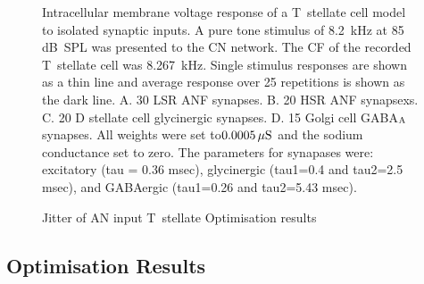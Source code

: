 \begin{figure}[htb]
  \centering
  \caption[Response of T~stellate cells to isolated synaptic
  inputs]{Intracellular membrane voltage response of a T~stellate cell model to isolated synaptic inputs.
A pure tone stimulus of 8.2~kHz at 85 dB~SPL was presented to the CN network. The CF of the recorded T~stellate cell was 8.267~kHz.
Single stimulus responses are shown as a thin line and average response over 25 repetitions is shown as the dark line.
A. 30 LSR ANF synapses.
B. 20 HSR ANF synapsexs.
C. 20 D stellate cell glycinergic synapses.
D. 15 Golgi cell GABA$_{\rm A}$ synapses.
All weights were set to$0.0005\,\mu{\rm S}$ and the sodium conductance set to zero.
The parameters for synapases were: excitatory (tau = 0.36 msec), glycinergic (tau1=0.4 and tau2=2.5 msec), and GABAergic (tau1=0.26 and tau2=5.43 msec).\label{fig:TSinputs}}
\end{figure}

\begin{figure}[htb]
  \centering
  \caption[]{Jitter of AN input T~stellate Optimisation results}
  \label{fig:CSjitter}
\end{figure}




\clearpage
\subsection{Optimisation Results}

